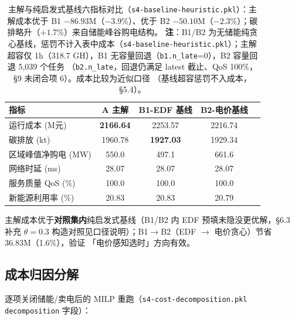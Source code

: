 \documentclass{internal-report}
\begin{document}
\begin{table}[H]
\centering
\footnotesize
\begin{tabular}{lcccc}
\toprule
指标 & A 主解 & B1-EDF 基线 & B2-电价基线 \\
\midrule
运行成本 (M元) & \textbf{2166.64} & 2253.57 & 2216.74 \\
碳排放 (kt) & 1960.78 & \textbf{1927.03} & 1929.34 \\
区域峰值净购电 (MW) & 550.0 & 497.1 & 661.6 \\
网络时延 (ms) & 28.07 & 28.07 & 28.07 \\
服务质量 QoS (\%) & 100.0 & 100.0 & 100.0 \\
新能源利用率 (\%) & 20.83 & 20.83 & 20.79 \\
\bottomrule
\end{tabular}
\caption{主解与纯启发式基线六指标对比（\texttt{s4-baseline-heuristic.pkl}）：主解成本优于 B1
$-86.93$M（$-3.9\%$）、优于 B2 $-50.10$M（$-2.3\%$）；碳排略升（$+1.7\%$）来自储能峰谷购电结构。
\textbf{注}：B1/B2 为无储能纯贪心基线，惩罚不计入表中成本（\texttt{s4-baseline-heuristic.pkl}）；主解
超容仅 1h（318.7 GH），B1 无容量回退（\texttt{b1.n\_late}=0），B2 容量回退 5{,}039 个任务
（\texttt{b2.n\_late}，回退仍满足 latest 截止、QoS 100\%，§9 未闭合项 6）。成本比较为近似口径
（基线超容惩罚不入成本，§5.4）。}
\label{tab:baseline}
\end{table}

主解成本优于\textbf{对照集内}纯启发式基线（B1/B2 内 EDF 预填未隐没更优解，§6.3 补充
$\theta{=}0.3$ 构造对照见口径说明）；B1$\to$B2（EDF $\to$ 电价贪心）节省 36.83M（1.6\%），验证
「电价感知选时」方向有效。

\subsection{成本归因分解}
\label{sec:decomp}

逐项关闭储能/卖电后的 MILP 重跑（\texttt{s4-cost-decomposition.pkl} \texttt{decomposition} 字段）：
\end{document}
